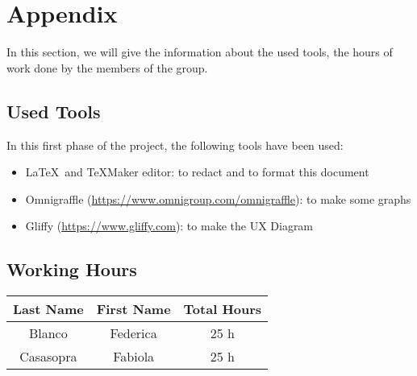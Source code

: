 \section{Appendix} \label{sec:appendix}

In this section, we will give the information about the used tools, the hours of work done by the members of the group.

\subsection{Used Tools} \label{tools}

In this first phase of the project, the following tools have been used:

\begin{itemize}
	\item \LaTeX\ and TeXMaker editor: to redact and to format this document
	\item Omnigraffle (\url{https://www.omnigroup.com/omnigraffle}): to make some graphs
	\item Gliffy (\url{https://www.gliffy.com}): to make the UX Diagram
\end{itemize}

\subsection{Working Hours} \label{worked}

\begin{table}[htbp]
\begin{center}
\begin{tabular}[t]{ccc}

\hline
\textbf{Last Name} & \textbf{First Name} & \textbf{Total Hours} \\
\hline
Blanco & Federica &  25 h\\
\hline
Casasopra & Fabiola &  25 h\\
\hline

\end{tabular}
\end{center}
\end{table}


